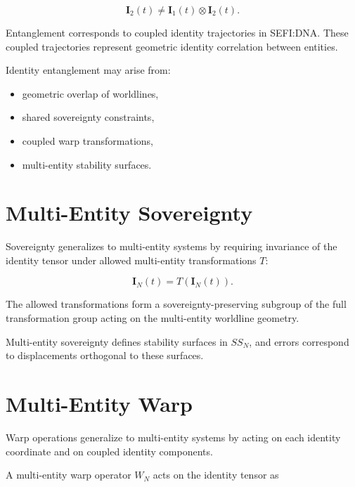 \documentclass[12pt,twoside]{article}
\begin{document}
\[
\mathbf{I}_{2}(t) \neq \mathbf{I}_{1}(t) \otimes \mathbf{I}_{2}(t).
\]



Entanglement corresponds to coupled identity trajectories in SEFI:DNA. These coupled
trajectories represent geometric identity correlation between entities.

Identity entanglement may arise from:

\begin{itemize}
    \item geometric overlap of worldlines,
    \item shared sovereignty constraints,
    \item coupled warp transformations,
    \item multi-entity stability surfaces.
\end{itemize}

\section{Multi-Entity Sovereignty}

Sovereignty generalizes to multi-entity systems by requiring invariance of the identity tensor
under allowed multi-entity transformations $T$:



\[
\mathbf{I}_{N}(t) = T(\mathbf{I}_{N}(t)).
\]



The allowed transformations form a sovereignty-preserving subgroup of the full
transformation group acting on the multi-entity worldline geometry.

Multi-entity sovereignty defines stability surfaces in $SS_{N}$, and errors correspond to
displacements orthogonal to these surfaces.

\section{Multi-Entity Warp}

Warp operations generalize to multi-entity systems by acting on each identity coordinate
and on coupled identity components.

A multi-entity warp operator $W_{N}$ acts on the identity tensor as
\end{document}
